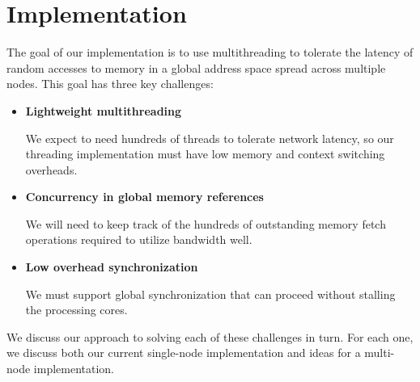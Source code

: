 \documentclass[10pt,nocopyrightspace,preprint]{sigplanconf}
\begin{document}
\begin {comment}
\todo{ discussion of coroutines \& synchronization } Were a coroutine to
block on a synchronization variable shared with other threads, the
entire fray would suspend execution.  This can lead to deadlock when,
for example, one coroutine waits to consume from another thread that
is waiting to consume what only another coroutine in this first fray
can produce.  Instead, coroutines must yield on failed synchronization
events, spinning rather than blocking, where were they bona fide
threads, blocking might be more efficient.

\todo{ say something about ``synchronization'' within a fray }

Coroutines completing their work yield without adding themselves to
the scheduling queue.  The last coroutine to exit in this way returns
as the main thread, as in the common  fork-join model of parallelism.

\end{comment}

\section{Implementation}
\label{sec:approach}
The goal of our implementation is to use multithreading to tolerate
the latency of random accesses to memory in a global address space
spread across multiple nodes. This goal has three key challenges:
\begin{itemize}
\item {\bf Lightweight multithreading}
  
  We expect to need hundreds of
  threads to tolerate network latency, so our threading
  implementation must have low memory and context switching overheads.

\item {\bf Concurrency in global memory references}

  We will need to keep track of the hundreds of outstanding memory fetch operations required to utilize bandwidth well.

\item {\bf Low overhead synchronization}

  We must support global synchronization that can proceed without stalling the processing cores.

\end{itemize}
We discuss our approach to solving each of these challenges in
turn. For each one, we discuss both our current single-node
implementation and ideas for a multi-node implementation.
\end{document}

